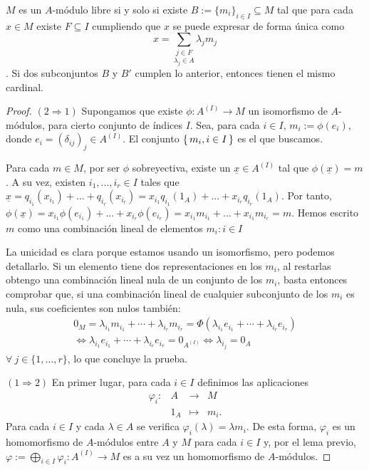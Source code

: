 \documentclass[../main.tex]{subfiles}
\begin{document}
\begin{proposition} $M$ es un $A$-módulo libre si y solo si existe $B:={\{m_i\}}_{i\in I}\subseteq M$ tal que para cada $x\in M$ existe $F\subseteq I$ cumpliendo que $x$ se puede expresar de forma única como$$x=\underset{\lambda_j\in A}{\sum_{j\in F}}\lambda_j m_j$$. Si dos subconjuntos $B$ y $B'$ cumplen lo anterior, entonces tienen el mismo cardinal.
\end{proposition}
\begin{proof}
$(2\Rightarrow 1)$ Supongamos que existe $\phi: A^{(I)}\rightarrow M$ un isomorfismo de $A$-módulos, para cierto conjunto de índices $I$. Sea, para cada $i\in I$, $m_i:=\phi(e_i)$, donde $e_i = (\delta_{ij})_j\in A^{(I)}$. El conjunto $\set{m_i,i\in I}$ es el que buscamos.

Para cada $m\in M$, por ser $\phi$ sobreyectiva, existe un $\underline{x}\in A^{(I)}$ tal que $\phi(\underline{x})=m$. A su vez, existen $i_1,...,i_r\in I$ tales que $\underline{x}=q_{i_1}(x_{i_1})+...+q_{i_r}(x_{i_r})=x_{i_1}q_{i_1}(1_A)+...+x_{i_r}q_{i_r}(1_A)$. Por tanto, $\phi(\underline{x})=x_{i_1}\phi(e_{i_1})+...+x_{i_r}\phi(e_{i_r})=x_{i_1}m_{i_1}+...+x_{i_1}m_{i_r}=m$. Hemos escrito $m$ como una combinación lineal de elementos ${m_i:i\in I}$

La unicidad es clara porque estamos usando un isomorfismo, pero podemos detallarlo. Si un elemento tiene dos representaciones en los $m_i$, al restarlas obtengo una combinación lineal nula de un conjunto de los $m_i$, basta entonces comprobar que, si una combinación lineal de cualquier subconjunto de los $m_i$ es nula, sus coeficientes son nulos también:
\begin{multline}
  0_M = \lambda_{i_1}m_{i_1}+\cdots+\lambda_{i_r}m_{i_r} = \Phi(\lambda_{i_1}e_{i_1}+\cdots+\lambda_{i_r}e_{i_r}) \\
  \Longleftrightarrow \lambda_{i_1}e_{i_1}+\cdots+\lambda_{i_r}e_{i_r}=0_{A^{(I)}}\Longleftrightarrow\lambda_{i_j}=0_A
\end{multline}
$\forall\ j\in\{1,\dots,r\}$, lo que concluye la prueba.

$(1\Rightarrow 2)$ En primer lugar, para cada $i\in I$ definimos las aplicaciones
$$\begin{array}{rccl}
    \varphi_i:&A&\longrightarrow&M\\
    &1_A&\longmapsto&m_i.
\end{array}$$
Para cada $i\in I$ y cada $\lambda\in A$ se verifica $\varphi_i(\lambda)=\lambda m_i$.
De esta forma, $\varphi_i$ es un homomorfismo de $A$-módulos entre $A$ y $M$ para cada $i\in I$ y, por el lema previo, $\varphi:=\bigoplus_{i\in I}\varphi_i: A^{(I)}\longrightarrow M$ es a su vez un homomorfismo de $A$-módulos.


\end{proof}
\end{document}
